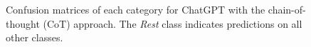\documentclass[letterpaper]{article}
\begin{document}
\begin{figure}[h!]
  \centering
 \caption{Confusion matrices of each category for ChatGPT with the chain-of-thought (CoT) approach. The \textit{Rest} class indicates predictions on all other classes.}
 \label{con-mat}
\end{figure}
\end{document}
